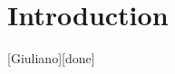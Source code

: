 \documentclass[authoryear,preprint,review,12pt]{elsarticle}
\begin{document}
\begin{frontmatter}
\begin{abstract}
\end{abstract}

\begin{keyword}



\end{keyword}

\end{frontmatter}

\tableofcontents
\linenumbers

\section{Introduction}[Giuliano][done]
\end{document}
